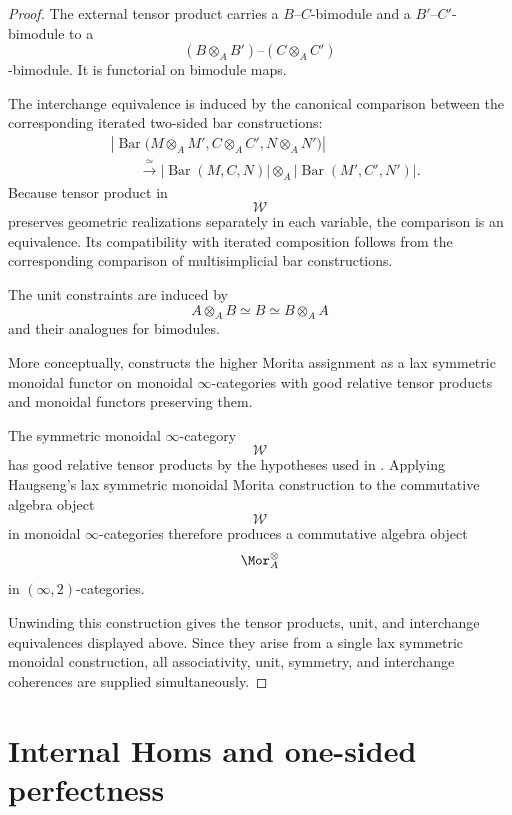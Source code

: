 \begin{proof}
The external tensor product carries a $B$--$C$-bimodule and a
$B'$--$C'$-bimodule to a
\[
    (B\otimes_A B')
    \text{--}
    (C\otimes_A C')
\]
-bimodule. It is functorial on bimodule maps.

The interchange equivalence is induced by the canonical comparison
between the corresponding iterated two-sided bar constructions:
\[
\begin{aligned}
    &
    \left|
        \operatorname{Bar}
        \bigl(
            M\otimes_A M',
            C\otimes_A C',
            N\otimes_A N'
        \bigr)
    \right|
    \\
    &\qquad\xrightarrow{\;\simeq\;}
    \left|
        \operatorname{Bar}(M,C,N)
    \right|
    \otimes_A
    \left|
        \operatorname{Bar}(M',C',N')
    \right|.
\end{aligned}
\]
Because tensor product in
\[
    \mathcal W
\]
preserves geometric realizations separately in each variable, the
comparison is an equivalence. Its compatibility with iterated
composition follows from the corresponding comparison of
multisimplicial bar constructions.

The unit constraints are induced by
\[
    A\otimes_A B
    \simeq
    B
    \simeq
    B\otimes_A A
\]
and their analogues for bimodules.

More conceptually,
\cite[Corollary~5.42]{HaugsengHigherMorita}
constructs the higher Morita assignment as a lax symmetric monoidal
functor on monoidal $\infty$-categories with good relative tensor
products and monoidal functors preserving them.

The symmetric monoidal $\infty$-category
\[
    \mathcal W
\]
has good relative tensor products by the hypotheses used in
. Applying Haugseng's lax symmetric
monoidal Morita construction to the commutative algebra object
\[
    \mathcal W
\]
in monoidal $\infty$-categories therefore produces a commutative algebra
object
\[
    \Mor_A^\otimes
\]
in $(\infty,2)$-categories.

Unwinding this construction gives the tensor products, unit, and
interchange equivalences displayed above. Since they arise from a single
lax symmetric monoidal construction, all associativity, unit, symmetry,
and interchange coherences are supplied simultaneously.
\end{proof}

\section{Internal Homs and one-sided perfectness}
\label{sec:right-perfect-morita-adjoints}


